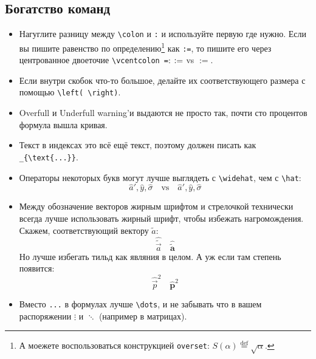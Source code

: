 \subsection*{Богатство команд}


\begin{itemize}

\item Нагуглите разницу между \verb+\colon+ и \verb+:+ и используйте первую где нужно. Если вы пишите равенство по определению\footnote{
А моежете воспользоваться конструкцией \texttt{overset}: 
$S(\alpha) \overset{\text{def}}{=} \sqrt{\alpha}$.
}  как \verb+:=+, то пишите его через центрованное двоеточие \verb+\vcentcolon =+: $\vcentcolon =$ vs $:=$.
\item Если внутри скобок что-то большое, делайте их соответствующего размера с помощью \verb+\left( \right)+.
\item Overfull и Underfull warning'и выдаются не просто так, почти сто процентов формула вышла кривая.
\item Текст в индексах это всё ещё текст, поэтому должен писать как \verb+_{\text{...}}+.

\item Операторы некоторых букв могут лучше выглядеть с \verb+\widehat+, чем с \verb+\hat+:
\[
\widehat{a}',\widehat{y}, \widehat{\sigma}\quad \text{vs}\quad \hat{a}',\hat{y}, \hat{\sigma} 
\]
\item Между обозначение векторов жирным шрифтом и стрелочкой технически всегда лучше использовать жирный шрифт, чтобы избежать нагромождения. Скажем, соответствующий вектору $\tilde{a}$:
\[
\widehat{\tilde{\vec{a}}} \quad \widehat{\tilde{\mathbf{a}}}
\] 
Но лучше избегать тильд как являния в целом. А уж если там степень появится:
\[
\widehat{\vec{p}}^2 \quad \widehat{\mathbf{p}}^2
\]
\item Вместо \verb+...+ в формулах лучше \verb+\dots+, и не забывать что в вашем распоряжении  $\vdots$ и  $\ddots$ (например в матрицах).


\end{itemize}
